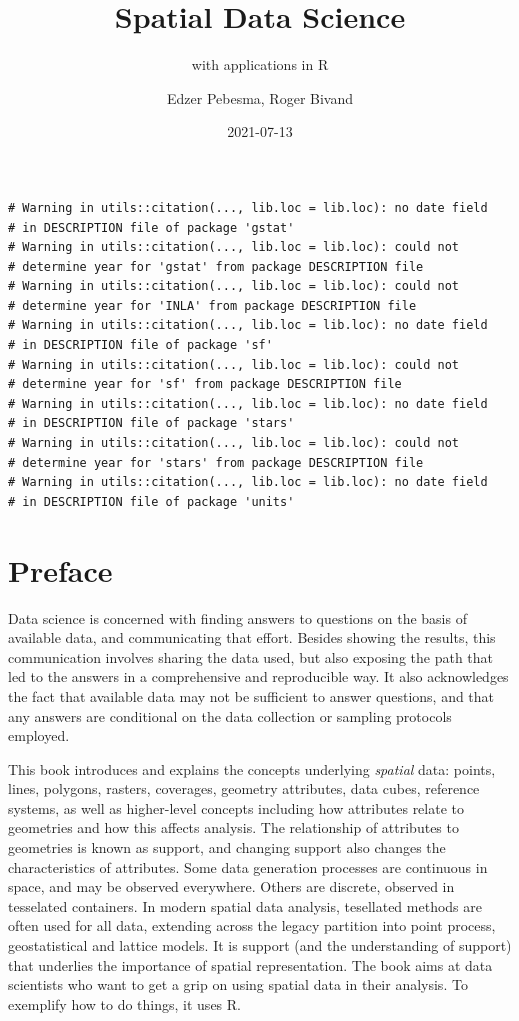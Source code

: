 \documentclass[]{book}
\title{Spatial Data Science}
\subtitle{with applications in R}
\author{Edzer Pebesma, Roger Bivand}
\date{2021-07-13}
\begin{document}
\maketitle

{
\setcounter{tocdepth}{1}
\tableofcontents
}
\begin{verbatim}
# Warning in utils::citation(..., lib.loc = lib.loc): no date field
# in DESCRIPTION file of package 'gstat'
# Warning in utils::citation(..., lib.loc = lib.loc): could not
# determine year for 'gstat' from package DESCRIPTION file
# Warning in utils::citation(..., lib.loc = lib.loc): could not
# determine year for 'INLA' from package DESCRIPTION file
# Warning in utils::citation(..., lib.loc = lib.loc): no date field
# in DESCRIPTION file of package 'sf'
# Warning in utils::citation(..., lib.loc = lib.loc): could not
# determine year for 'sf' from package DESCRIPTION file
# Warning in utils::citation(..., lib.loc = lib.loc): no date field
# in DESCRIPTION file of package 'stars'
# Warning in utils::citation(..., lib.loc = lib.loc): could not
# determine year for 'stars' from package DESCRIPTION file
# Warning in utils::citation(..., lib.loc = lib.loc): no date field
# in DESCRIPTION file of package 'units'
\end{verbatim}

\hypertarget{preface}{%
\chapter*{Preface}\label{preface}}

Data science is concerned with finding answers to questions on the
basis of available data, and communicating that effort. Besides
showing the results, this communication involves sharing the data
used, but also exposing the path that led to the answers in a
comprehensive and reproducible way. It also acknowledges the fact
that available data may not be sufficient to answer questions, and
that any answers are conditional on the data collection or sampling
protocols employed.

This book introduces and explains the concepts underlying
\emph{spatial} data: points, lines, polygons, rasters, coverages, geometry
attributes, data cubes, reference systems, as well as higher-level
concepts including how attributes relate to geometries and how
this affects analysis. The relationship of attributes to geometries
is known as support, and changing support also changes the
characteristics of attributes. Some data generation processes are
continuous in space, and may be observed everywhere. Others are
discrete, observed in tesselated containers. In modern spatial data
analysis, tesellated methods are often used for all data, extending
across the legacy partition into point process, geostatistical and
lattice models. It is support (and the understanding of support) that
underlies the importance of spatial representation. The book aims
at data scientists who want to get a grip on using spatial data
in their analysis. To exemplify how to do things, it uses R.
\end{document}
